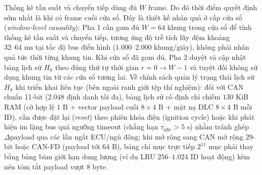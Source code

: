 \documentclass[12pt, a4paper, reqno, oneside]{book}
\begin{document}
Thống kê tần suất và chuyển tiếp dùng đủ $W$ frame. Do đó thời điểm quyết định sớm nhất là khi có frame cuối cửa sổ. Đây là thiết kế nhân quả ở cấp cửa sổ (\textit{window-level causality}): Pha 1 cần gom đủ $W=64$ khung trong cửa sổ để tính thống kê tần suất và chuyển tiếp, tương ứng độ trễ tích lũy đệm khoảng $32\text{--}64\text{ ms}$ tại tốc độ bus điển hình ($1.000\text{--}2.000\text{ khung/giây}$), không phải nhân quả tức thời từng khung tin. Khi cửa sổ đã gom đủ, Pha 2 duyệt và cập nhật bảng lịch sử $H_k$ theo đúng thứ tự thời gian $r=0\to W-1$ và tuyệt đối không sử dụng khung tin từ các cửa sổ tương lai. Về chính sách quản lý trạng thái lịch sử $H_k$ khi triển khai liên tục (bên ngoài ranh giới tệp thí nghiệm): đối với CAN chuẩn 11-bit ($2.048$ định danh tối đa), bảng lịch sử cố định chỉ chiếm $130\text{ KiB}$ RAM (cờ hợp lệ $1\text{ B}$ + vector payload cuối $8\times 4\text{ B}$ + mặt nạ DLC $8\times 4\text{ B}$ mỗi ID), cần được đặt lại (\textit{reset}) theo phiên khóa điện (ignition cycle) hoặc khi phát hiện im lặng bus quá ngưỡng timeout (chẳng hạn $\tau_{\text{idle}}>5\text{ s}$) nhằm tránh ghép $\Delta\text{payload}$ qua các lần ngắt ECU/ngủ đông; khi mở rộng sang CAN mở rộng 29-bit hoặc CAN-FD (payload tới $64\text{ B}$), bảng chỉ mục trực tiếp $2^{11}$ mục phải thay bằng bảng băm giới hạn dung lượng (ví dụ LRU $256\text{--}1.024$ ID hoạt động) kèm nén tóm tắt payload vượt 8 byte.
\end{document}
